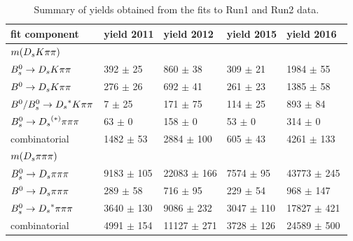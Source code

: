 \begin{table}[h]
\centering
 \begin{tabular}{l || l l l l}
fit component & yield 2011 & yield 2012 & yield 2015 & yield 2016\ \\
\hline\hline
$m({{D}_{s}}{K}{\pi}{\pi})$ &  &  &  &  \\
\hline
${{B}^0_{s}}\rightarrow{\ensuremath{{D}_{s}}}{\ensuremath{K}}{\ensuremath{\pi}}{\ensuremath{\pi}}$ & 392 $\pm$ 25 & 860 $\pm$ 38 & 309 $\pm$ 21 & 1984 $\pm$ 55 \\
${{B}^0}\rightarrow{\ensuremath{{D}_{s}}}{\ensuremath{K}}{\ensuremath{\pi}}{\ensuremath{\pi}}$ & 276 $\pm$ 26 & 692 $\pm$ 41 & 261 $\pm$ 23 & 1385 $\pm$ 58 \\
${{B}^0}/{{B}^0_{s}}\rightarrow{\ensuremath{{D}_{s}}}^{*}{K}{\pi}{\pi}$ & 7 $\pm$ 25 & 171 $\pm$ 75 & 114 $\pm$ 25 & 893 $\pm$ 84 \\
${{B}^0_{s}}\rightarrow{\ensuremath{{D}_{s}}}^{(*)}{\pi}{\pi}{\pi}$ & 63 $\pm$ 0 & 158 $\pm$ 0 & 53 $\pm$ 0 & 314 $\pm$ 0 \\
combinatorial & 1482 $\pm$ 53 & 2884 $\pm$ 100 & 605 $\pm$ 43 & 4261 $\pm$ 133 \\
\hline\hline
$m({{D}_{s}}{\pi}{\pi}{\pi})$ &  &  &  &  \\
\hline
${{B}^0_{s}}\rightarrow{\ensuremath{{D}_{s}}}{\ensuremath{\pi}}{\ensuremath{\pi}}{\ensuremath{\pi}}$ & 9183 $\pm$ 105 & 22083 $\pm$ 166 & 7574 $\pm$ 95 & 43773 $\pm$ 245 \\
${{B}^0}\rightarrow{\ensuremath{{D}_{s}}}{\ensuremath{\pi}}{\ensuremath{\pi}}{\ensuremath{\pi}}$ & 289 $\pm$ 58 & 716 $\pm$ 95 & 229 $\pm$ 54 & 968 $\pm$ 147 \\
${{B}^0_{s}}\rightarrow{\ensuremath{{D}_{s}}}^{*}{\pi}{\pi}{\pi}$ & 3640 $\pm$ 130 & 9086 $\pm$ 232 & 3047 $\pm$ 110 & 17827 $\pm$ 421 \\
combinatorial & 4991 $\pm$ 154 & 11127 $\pm$ 271 & 3728 $\pm$ 126 & 24589 $\pm$ 500 \\
\hline
\end{tabular}
\caption{Summary of yields obtained from the fits to Run1 and Run2 data.}
\label{table:YieldsFromMassfit}
\end{table}


